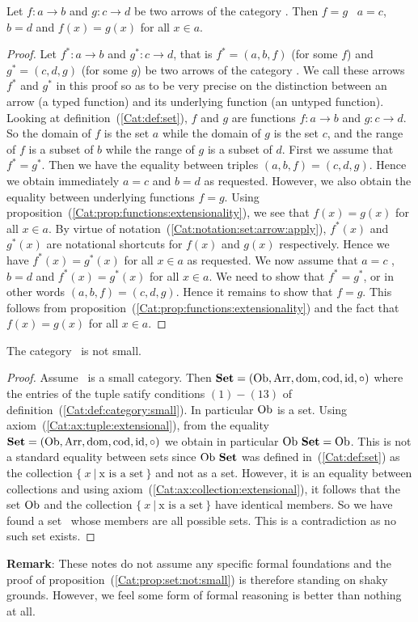 \begin{prop}\label{Cat:prop:set:arrow:equal}
    Let $f:a\to b$ and $g:c\to d$ be two arrows of the category \Set. Then 
    $f=g$ \ifand\ $a=c$, $b=d$ and $f(x)=g(x)$ for all $x\in a$.
\end{prop}
\begin{proof}
    Let $f^{*}:a \to b$ and $g^{*}:c \to d$, that is $f^{*}=(a,b,f)$ 
    (for some $f$) and $g^{*}=(c,d,g)$ (for some $g$) be two arrows
    of the category \Set. We call these arrows $f^{*}$ and $g^{*}$ in
    this proof so as to be very precise on the distinction between
    an arrow (a typed function) and its underlying function (an
    untyped function). Looking at definition~(\ref{Cat:def:set}), 
    $f$ and $g$ are functions $f:a\to b$ and $g:c\to d$. So the 
    domain of $f$ is the set $a$ while the domain of $g$ 
    is the set $c$, and the range of $f$ is a subset of $b$ while the range of 
    $g$ is a subset of $d$. First we assume that $f^{*}=g^{*}$. Then we have 
    the equality between triples $(a,b,f)=(c,d,g)$. Hence we obtain immediately
    $a=c$ and $b=d$ as requested. However, we also obtain the equality
    between underlying functions $f=g$. Using 
    proposition~(\ref{Cat:prop:functions:extensionality}), we see
    that $f(x)=g(x)$ for all $x\in a$. By virtue of
    notation~(\ref{Cat:notation:set:arrow:apply}), $f^{*}(x)$ and 
    $g^{*}(x)$ are notational shortcuts for $f(x)$ and $g(x)$ 
    respectively. Hence we have $f^{*}(x)=g^{*}(x)$ for all $x\in a$
    as requested. We now assume that $a=c$ , $b=d$ and $f^{*}(x)=g^{*}(x)$
    for all $x\in a$. We need to show that $f^{*}=g^{*}$, or in other
    words $(a,b,f)=(c,d,g)$. Hence it remains to show that $f=g$. This
    follows from proposition~(\ref{Cat:prop:functions:extensionality}) and
    the fact that $f(x)=g(x)$ for all $x\in a$.
\end{proof}

\begin{prop}\label{Cat:prop:set:not:small}
    The category \Set\ is not small.
\end{prop}
\begin{proof}
    Assume \Set\ is a small category. Then $\mbox{\bf Set}=(\mbox{\rm Ob}, \mbox{\rm Arr}, \mbox{\rm dom}, 
    \mbox{\rm cod}, \mbox{\rm id}, \circ)$ where the entries of the tuple satify 
    conditions $(1)-(13)$ of definition~(\ref{Cat:def:category:small}).
    In particular $\mbox{\rm Ob}$ is a set. Using
    axiom~(\ref{Cat:ax:tuple:extensional}), from the equality 
    $\mbox{\bf Set}=(\mbox{\rm Ob}, \mbox{\rm Arr}, \mbox{\rm dom}, \mbox{\rm cod}, \mbox{\rm id}, \circ)$ we obtain in 
    particular $\mbox{\rm Ob}\ \mbox{\bf Set}=\mbox{\rm Ob}$. This is not a standard equality
    between sets since $\mbox{\rm Ob}\ \mbox{\bf Set}$ was defined 
    in~(\ref{Cat:def:set}) as the collection 
    $\{\ x\ |\ \mbox{x is a set}\ \}$ and not as a set.
    However, it is an equality between collections and 
    using axiom~(\ref{Cat:ax:collection:extensional}), it follows
    that the set $\mbox{\rm Ob}$ and the collection 
    $\{\ x\ |\ \mbox{x is a set}\ \}$ have identical members.
    So we have found a set \ob\ whose members are all possible sets.
    This is a contradiction as no such set exists.
\end{proof}

\noindent
{\bf Remark}: These notes do not assume any specific formal 
foundations and the proof of 
proposition~(\ref{Cat:prop:set:not:small}) is therefore standing
on shaky grounds. However, we feel some form of formal reasoning
is better than nothing at all.

